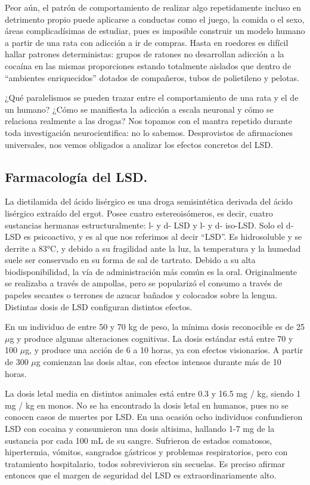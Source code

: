 Peor aún, el patrón de comportamiento de realizar algo repetidamente incluso en detrimento propio puede aplicarse a conductas como el juego, la comida o el sexo, áreas complicadísimas de estudiar, pues es imposible construir un modelo humano a partir de una rata con adicción a ir de compras. Hasta en roedores es difícil hallar patrones deterministas: grupos de ratones no desarrollan adicción a la cocaína en las mismas proporciones estando totalmente aislados que dentro de \enquote{ambientes enriquecidos} dotados de compañeros, tubos de polietileno y pelotas.

¿Qué paralelismos se pueden trazar entre el comportamiento de una rata y el de un humano? ¿Cómo se manifiesta la adicción a escala neuronal y cómo se relaciona realmente a las drogas? Nos topamos con el mantra repetido durante toda investigación neurocientifica: no lo sabemos. Desprovistos de afirmaciones universales, nos vemos obligados a analizar los efectos concretos del LSD.

\subsection{Farmacología del LSD.}

La dietilamida del ácido lisérgico es una droga semisintética derivada del ácido lisérgico extraído del ergot. Posee cuatro estereoisómeros, es decir, cuatro sustancias hermanas estructuralmente: l- y d- LSD y l- y d- iso-LSD. Solo el d-LSD es psicoactivo, y es al que nos referimos al decir \enquote{LSD}. Es hidrosoluble y se derrite a 83°C, y debido a su fragilidad ante la luz, la temperatura y la humedad suele ser conservado en su forma de sal de tartrato. Debido a su alta biodisponibilidad, la vía de administración más común es la oral. Originalmente se realizaba a través de ampollas, pero se popularizó el consumo a través de papeles secantes o terrones de azucar bañados y colocados sobre la lengua. Distintas dosis de LSD configuran distintos efectos.

En un individuo de entre 50 y 70 kg de peso, la mínima dosis reconocible es de 25 $\mu$g y produce algunas alteraciones cognitivas. La dosis estándar está entre 70 y 100 $\mu$g, y produce una acción de 6 a 10 horas, ya con efectos visionarios. A partir de 300 $\mu$g comienzan las dosis altas, con efectos intensos durante más de 10 horas.

La dosis letal media en distintos animales está entre 0.3 y 16.5 mg / kg, siendo 1 mg / kg en monos. No se ha encontrado la dosis letal en humanos, pues no se conocen casos de muertes por LSD. En una ocasión ocho individuos confundieron LSD con cocaina y consumieron una dosis altisima, hallando 1-7 mg de la sustancia por cada 100 mL de su sangre. Sufrieron de estados comatosos, hipertermia, vómitos, sangrados gástricos y problemas respiratorios, pero con tratamiento hospitalario, todos sobrevivieron sin secuelas. Es preciso afirmar entonces que el margen de seguridad del LSD es extraordinariamente alto.

